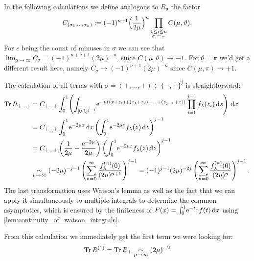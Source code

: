 In the following calculations we define analogous to $R_\sigma$ the factor
\begin{equation}
  C_{(\sigma_1,\ldots,\sigma_n)} := (-1)^{n+1}\Bigl(\frac{1}{2\mu}\Bigr)^n
  \prod_{ \substack{ 1\le i \le n \\ \sigma_i = - }} C(\mu,\theta).
\end{equation}
For $c$ being the count of minuses in $\sigma$ we can see that
$\lim_{\mu\to\infty} C_\sigma = (-1)^{n+c+1} (2\mu)^{-n}$, since $C(\mu,\theta)
\to -1$. For $\theta = \pi$ we'd get a different result here, namely $C_\sigma
\to (-1)^{n+1}(2\mu)^{-n}$ since $C(\mu,\pi)\to +1$.

The calculation of all terms with $\sigma=(+,\ldots,+)\in\{-,+\}^j$ is
straightforward:
\begin{equation}
  \label{frm:r-plusplus}
  \begin{split}
    \Tr R_{+\ldots+} &=
    C_{+\ldots+}
    \Int{x}{\left(
      \Integ{[0,1]^{j-1}}{z}{
        \Eto{-\mu((x + z_1) + (z_1 + z_2) + \ldots + (z_{j-1} + x))}
        \prod_{i=1}^{j-1} f_\lambda(z_i)
      }\right)
    } \\
    &= C_{+\ldots+}
    \Int{x}{\Eto{-2\mu x}} \left(\Int{z}{\Eto{-2\mu
    z}f_\lambda(z)}\right)^{j-1} \\
    &= C_{+\ldots+}
    \left(\frac1{2\mu} - \frac{\Eto{-2\mu}}{2\mu}\right)
    \left(\Int{z}{\Eto{-2\mu z}f_\lambda(z)}\right)^{j-1} \\
    &\SimMu (-2\mu)^{-j-1}
    \left(\Wsum{f_\lambda^{(n)}}\right)^{j-1} = (-1)^{j-1} (2\mu)^{-2j}
    \left(\sum_{n=0}^\infty\frac{f_\lambda^{(n)}(0)}{(2\mu)^n}\right)^{j-1}.
  \end{split}
\end{equation}
The last transformation uses Watson's lemma as well as the fact that we can
apply it simultaneously to multiple integrals to determine the common
asymptotics, which is ensured by the finiteness of $F(x) =
\Int{x}{\Eto{-tx}f(t)}$ using \cref{lem:continuity_of_watson_integrals}.

From this calculation we immediately get the first term we were looking for:
\begin{equation}
  \label{eqn:tr1}
  \Tr R^{(1)} = \Tr R_+ \SimAs{\mu\to\infty} (2\mu)^{-2}
\end{equation}

